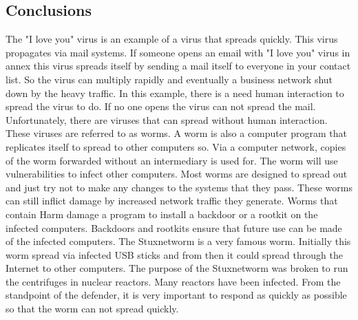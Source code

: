 \subsection{Conclusions}
The "I love you" virus is an example of a virus that spreads quickly. This virus propagates via mail systems. If someone opens an email with "I love you" virus in annex this virus spreads itself by sending a mail itself to everyone in your contact list. So the virus can multiply rapidly and eventually a business network shut down by the heavy traffic. In this example, there is a need human interaction to spread the virus to do. If no one opens the virus can not spread the mail.
Unfortunately, there are viruses that can spread without human interaction. These viruses are referred to as worms. A worm is also a computer program that replicates itself to spread to other computers so. Via a computer network, copies of the worm forwarded without an intermediary is used for. The worm will use vulnerabilities to infect other computers.
Most worms are designed to spread out and just try not to make any changes to the systems that they pass. These worms can still inflict damage by increased network traffic they generate. Worms that contain Harm damage a program to install a backdoor or a rootkit on the infected computers. Backdoors and rootkits ensure that future use can be made of the infected computers.
The Stuxnetworm is a very famous worm. Initially this worm spread via infected USB sticks and from then it could spread through the Internet to other computers. The purpose of the Stuxnetworm was broken to run the centrifuges in nuclear reactors. Many reactors have been infected. From the standpoint of the defender, it is very important to respond as quickly as possible so that the worm can not spread quickly.

